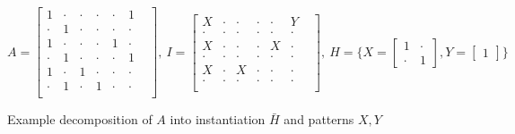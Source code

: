 
\small
$$
A =
\begin{bmatrix}
1 & \cdot & \cdot & \cdot & \cdot & 1 &  \\[-.2em]
\cdot & 1 & \cdot & \cdot & \cdot & \cdot &  \\[-.2em]
1 & \cdot & \cdot & \cdot & 1 & \cdot &  \\[-.2em]
\cdot & 1 & \cdot & \cdot & \cdot & 1 &  \\[-.2em]
1 & \cdot & 1 & \cdot & \cdot & \cdot &  \\[-.2em]
\cdot & 1 & \cdot & 1 & \cdot & \cdot &  \\
\end{bmatrix}\!\!, \
I = 
\begin{bmatrix}
X & \cdot & \cdot & \cdot & \cdot & Y &  \\[-.2em]
\cdot & \cdot & \cdot & \cdot & \cdot & \cdot &  \\[-.2em]
X & \cdot & \cdot & \cdot & X & \cdot &  \\[-.2em]
\cdot & \cdot & \cdot & \cdot & \cdot & \cdot &  \\[-.2em]
X & \cdot & X & \cdot & \cdot & \cdot &  \\[-.2em]
\cdot & \cdot & \cdot & \cdot & \cdot & \cdot &  \\
\end{bmatrix}\!\!, \
H = \{
X =
\begin{bmatrix}
1 & \cdot \\[-.2em]
\cdot & 1
\end{bmatrix}\!\!,
Y =
\begin{bmatrix}
1
\end{bmatrix}\}
$$
\caption{Example decomposition of $A$ into instantiation $\bar{H}$ and patterns $X,Y$}
